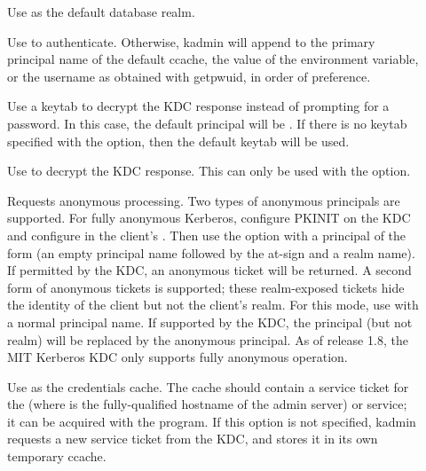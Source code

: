 \documentclass[letterpaper,10pt,english]{sphinxmanual}
\begin{document}
\begin{description}
\item[{ }] \leavevmode
Use  as the default database realm.

\item[{ }] \leavevmode
Use  to authenticate.  Otherwise, kadmin will append
 to the primary principal name of the default ccache,
the value of the  environment variable, or the username as
obtained with getpwuid, in order of preference.

\item[{}] \leavevmode
Use a keytab to decrypt the KDC response instead of prompting for
a password.  In this case, the default principal will be
.  If there is no keytab specified with the
 option, then the default keytab will be used.

\item[{ }] \leavevmode
Use  to decrypt the KDC response.  This can only be used
with the  option.

\item[{}] \leavevmode
Requests anonymous processing.  Two types of anonymous principals
are supported.  For fully anonymous Kerberos, configure PKINIT on
the KDC and configure  in the client’s
{\hyperref[\detokenize{admin/conf_files/krb5_conf:krb5-conf-5}]{}}.  Then use the  option with a principal
of the form  (an empty principal name followed by the
at-sign and a realm name).  If permitted by the KDC, an anonymous
ticket will be returned.  A second form of anonymous tickets is
supported; these realm-exposed tickets hide the identity of the
client but not the client’s realm.  For this mode, use  with a normal principal name.  If supported by the KDC, the
principal (but not realm) will be replaced by the anonymous
principal.  As of release 1.8, the MIT Kerberos KDC only supports
fully anonymous operation.

\item[{ }] \leavevmode
Use  as the credentials cache.  The
cache should contain a service ticket for the 
(where  is the fully-qualified hostname of the admin
server) or  service; it can be acquired with the
 program.  If this option is not specified, kadmin
requests a new service ticket from the KDC, and stores it in its
own temporary ccache.


\end{description}
\end{document}
